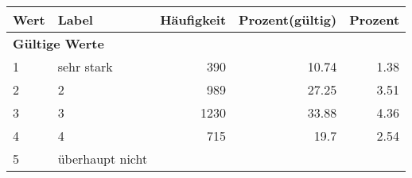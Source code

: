      \begin{longtable}{lXrrr}
     \toprule
     \textbf{Wert} & \textbf{Label} & \textbf{Häufigkeit} & \textbf{Prozent(gültig)} & \textbf{Prozent} \\
     \endhead
     \midrule
     \multicolumn{5}{l}{\textbf{Gültige Werte}}\\

     1 &
     \multicolumn{1}{X}{ sehr stark   } &


       \num{390} &
       \num[round-mode=places,round-precision=2]{10,74} &
         \num[round-mode=places,round-precision=2]{1,38} \\

     2 &
     \multicolumn{1}{X}{ 2   } &


       \num{989} &
       \num[round-mode=places,round-precision=2]{27,25} &
         \num[round-mode=places,round-precision=2]{3,51} \\

     3 &
     \multicolumn{1}{X}{ 3   } &


       \num{1230} &
       \num[round-mode=places,round-precision=2]{33,88} &
         \num[round-mode=places,round-precision=2]{4,36} \\

     4 &
     \multicolumn{1}{X}{ 4   } &


       \num{715} &
       \num[round-mode=places,round-precision=2]{19,7} &
         \num[round-mode=places,round-precision=2]{2,54} \\

     5 &
     \multicolumn{1}{X}{ überhaupt nicht   } &



\end{longtable}
